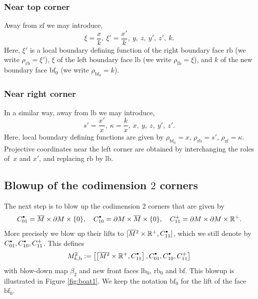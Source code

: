 \documentclass[11pt]{article}
\numberwithin{equation}{section}
\newcommand{\bbullet}{{\scriptscriptstyle\bullet}}
\newcommand{\sbullet}{{\raisebox{1pt}{$\bbullet$}}}
\theoremstyle{plain}
\theoremstyle{definition}
\newcommand{\R}{{\mathbb{R}}}
\newcommand{\lf}{{\mathrm{lb}}}
\newcommand{\rf}{{\mathrm{rb}}}
\newcommand{\bb}{{\mathrm{b}}}
\newcommand{\lfz}{{\mathrm{lb}_0}}
\newcommand{\rfz}{{\mathrm{rb}_0}}
\newcommand{\bbf}{{\mathrm{bf}}}
\newcommand{\bfz}{{\bbf_0}}
\newcommand{\zf}{{\mathrm{zf}}}
\newcommand{\Mbar}{{\overline{M}}}\let\M\Mbar
\begin{document}
\subsubsection*{Near top corner}
Away from $\zf$ we may introduce,
\begin{equation} \label{top corner}
\xi = \frac{x}{k}, \ \xi' = \frac{x'}{k}, \ y, \ z, \ y', \ z', \ k.
\end{equation}
Here, $\xi'$ is a local boundary defining function of the right boundary face $\rf$
(we write $\rho_{\rf} = \xi'$), $\xi$ of the
left boundary face $\lf$ (we write $\rho_{\lf} = \xi$), and $k$ of the new boundary face $\bfz$
(we write $\rho_{\bfz} = k$).

\subsubsection*{Near right corner}
In a similar way, away from $\lf$ we may introduce,
\begin{equation}\label{right corner}
s' = \frac{x'}{x}, \ \kappa = \frac{k}{x}, \ x, \ y, \ z, \ y', \ z'.
\end{equation}
Here, local boundary defining functions are given by
$ \rho_{\bfz} = x$, $\rho_{\rf} = s'$, $\rho_{\zf} = \kappa$.
Projective coordinates near the left corner are obtained by interchanging the
roles of~$x$ and $x'$, and replacing $\rf$ by $\lf$.

\subsection{Blowup of the codimension $2$ corners}
The next step is to blow up the codimension $2$ corners
that are given by
\begin{align*}
C_{01}^\sbullet = \Mbar \times \partial M \times \{0\}, \quad
C_{10}^\sbullet = \partial M \times \Mbar \times \{0\}, \quad
C_{11}^+ = \partial M \times \partial M \times \R^+.
\end{align*}
More precisely we blow up their lifts to $[\Mbar{}^2 \times \R^+, C_{11}^\sbullet]$,
which we still denote by $C_{01}^\sbullet, C_{10}^\sbullet, C_{11}^+$.
This defines
\begin{equation}\label{M2kb}
M^{2}_{k,\bb} := \left[ \left[\Mbar{}^2 \times \R^+, C_{11}^\sbullet\right], C_{01}^\sbullet, C_{10}^\sbullet, C_{11}^+\right]
\end{equation}
with blow-down map $\beta_2$ and new front faces $\lfz$, $\rfz$ and $\bbf$.
This blowup is illustrated in Figure \ref{fig:boat1}.
We keep the notation $\bbf_0$ for the lift of the face $\bbf_0$.
\end{document}
